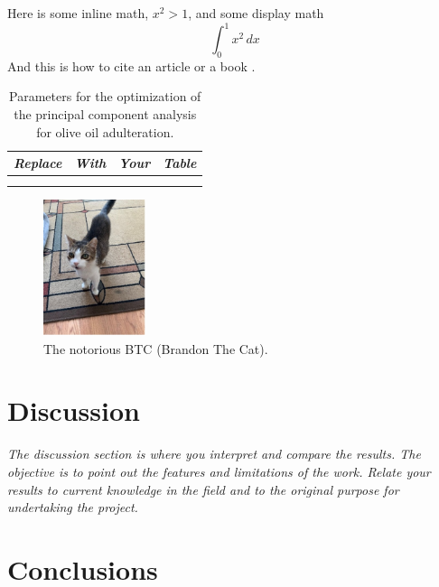 \documentclass[11pt,a4paper,oneside]{report}
\newcommand{\instructions}[1]{{\color{black}\itshape #1}}
\begin{document}
Here is some inline math, $x^2 > 1$, and some display math
\begin{equation}
  \int_0^1 x^2 \, dx
\end{equation}
And this is how to cite an article \cite{Zhang2021} or a book \cite{Axler2020}.

\begin{table}[htbp]
\centering
\begin{tabular}{@{}llll@{}}
\toprule
\emph{Replace} & \emph{With} & \emph{Your} & \emph{Table} \\
\midrule
& & & \\
& & & \\
\bottomrule
\end{tabular}
\caption{Parameters for the optimization of the principal component analysis for
olive oil adulteration.}
\label{tbl:2}  
\end{table}


\begin{figure}[htbp]
\centering
\includegraphics[height=4cm]{btc.jpg}
\caption{The notorious BTC (Brandon The Cat).}
\label{fig:1}
\end{figure}


\chapter{Discussion}
\label{discussion}

\instructions{The discussion section is where you interpret and compare the
results. The objective is to point out the features and limitations of
the work. Relate your results to current knowledge in the field and to
the original purpose for undertaking the project.}


\chapter{Conclusions}
\label{conclusions}
\end{document}
